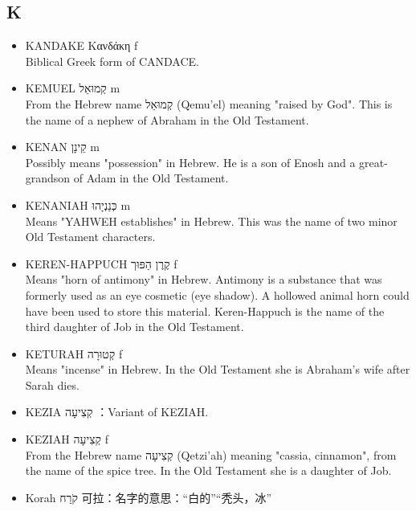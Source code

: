 \subsection{K}
\begin{itemize}
\itemsep-.5em 
\item KANDAKE Κανδάκη f \\
Biblical Greek form of CANDACE.
\item KEMUEL קְמוּאֵל m \\
From the Hebrew name קְמוּאֵל (Qemu'el) meaning "raised by God". This is the name of a nephew of Abraham in the Old Testament.
\item KENAN קֵינָן m \\
Possibly means "possession" in Hebrew. He is a son of Enosh and a great-grandson of Adam in the Old Testament.
\item KENANIAH כְּנַנְיָהוּ m \\
Means "YAHWEH establishes" in Hebrew. This was the name of two minor Old Testament characters.
\item KEREN-HAPPUCH קֶרֶן הַפּוּך f \\
Means "horn of antimony" in Hebrew. Antimony is a substance that was formerly used as an eye cosmetic (eye shadow). A hollowed animal horn could have been used to store this material. Keren-Happuch is the name of the third daughter of Job in the Old Testament.
\item KETURAH קְטוּרָה f \\
Means "incense" in Hebrew. In the Old Testament she is Abraham's wife after Sarah dies.
\item KEZIA קְצִיעָה ：Variant of KEZIAH.
\item KEZIAH קְצִיעָה f \\
From the Hebrew name קְצִיעָה (Qetzi'ah) meaning "cassia, cinnamon", from the name of the spice tree. In the Old Testament she is a daughter of Job.
\item Korah קֹרַח 可拉：名字的意思：“白的”“秃头，冰”
\end{itemize}

